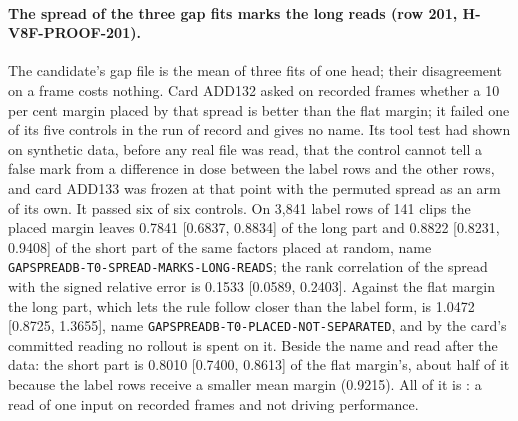 \paragraph{The spread of the three gap fits marks the long reads (row 201, H-V8F-PROOF-201).} The candidate's gap file is the mean of three fits of one head; their disagreement on a frame costs nothing. Card ADD132 asked on recorded frames whether a 10 per cent margin placed by that spread is better than the flat margin; it failed one of its five controls in the run of record and gives no name. Its tool test had shown on synthetic data, before any real file was read, that the control cannot tell a false mark from a difference in dose between the label rows and the other rows, and card ADD133 was frozen at that point with the permuted spread as an arm of its own. It passed six of six controls. On 3,841 label rows of 141 clips the placed margin leaves 0.7841 [0.6837, 0.8834] of the long part and 0.8822 [0.8231, 0.9408] of the short part of the same factors placed at random, name \texttt{GAPSPREADB-T0-SPREAD-MARKS-LONG-READS}; the rank correlation of the spread with the signed relative error is 0.1533 [0.0589, 0.2403]. Against the flat margin the long part, which lets the rule follow closer than the label form, is 1.0472 [0.8725, 1.3655], name \texttt{GAPSPREADB-T0-PLACED-NOT-SEPARATED}, and by the card's committed reading no rollout is spent on it. Beside the name and read after the data: the short part is 0.8010 [0.7400, 0.8613] of the flat margin's, about half of it because the label rows receive a smaller mean margin (0.9215). All of it is : a read of one input on recorded frames and not driving performance.

